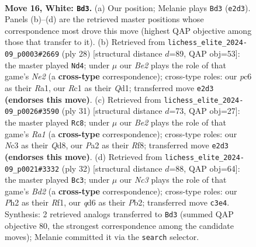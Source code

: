 \documentclass[11pt]{article}
\begin{document}
\clearpage

\begin{figure}[p]\centering
\begin{subfigure}{0.46\textwidth}\centering
\resizebox{\linewidth}{!}{%
\newchessgame
\chessboard[
  setfen={r1b1k2r/pp1n2pp/2pq4/3p2p1/3P4/2N1P3/PP2BPPP/2RQR1K1 w k - 6 16},
  showmover=false,
  pgfstyle=straightmove, color=movearrow, markmove={e2-d3}
]}
\caption{}
\end{subfigure}\hfill
\begin{subfigure}{0.46\textwidth}\centering
\resizebox{\linewidth}{!}{%
\newchessgame
\chessboard[
  setfen={rnb1k2r/5ppp/p3p3/1pqpP3/5P2/P1PB4/1P2N1PP/R2QK2R w KQkq - 0 15},
  showmover=false,
  pgfstyle=straightmove, color=movearrow, markmove={e2-d4}
]}
\caption{}
\end{subfigure}
\\[4pt]
\begin{subfigure}{0.46\textwidth}\centering
\resizebox{\linewidth}{!}{%
\newchessgame
\chessboard[
  setfen={r2q1rk1/1p1n1pp1/p2p4/P2Pp1bp/8/1N1Q1P2/1PP2BPP/R3K2R b KQ - 0 16},
  showmover=false,
  pgfstyle=straightmove, color=movearrow, markmove={a8-c8}
]}
\caption{}
\end{subfigure}\hfill
\begin{subfigure}{0.46\textwidth}\centering
\resizebox{\linewidth}{!}{%
\newchessgame
\chessboard[
  setfen={r3k2r/ppq2pb1/2n4p/3pPpp1/8/5N1P/PPPB1PP1/R2Q1RK1 w kq - 0 17},
  showmover=false,
  pgfstyle=straightmove, color=movearrow, markmove={d2-c3}
]}
\caption{}
\end{subfigure}
\caption{\textbf{Move 16, White: \texttt{Bd3}.} (a) Our position; Melanie plays \texttt{Bd3} (\texttt{e2d3}). Panels (b)--(d) are the retrieved master positions whose correspondence most drove this move (highest QAP objective among those that transfer to it). (b) Retrieved from \texttt{lichess\_elite\_2024-09\_p0003\#2669} (ply 28) [structural distance $d$=89, QAP obj=53]: the master played \texttt{Nd4}; under $\mu$ our \emph{Be2} plays the role of that game's \emph{Ne2} (a \textbf{cross-type} correspondence); cross-type roles: our \emph{p}c6 as their \emph{R}a1, our \emph{R}c1 as their \emph{Q}d1; transferred move \texttt{e2d3} \textbf{(endorses this move)}. (c) Retrieved from \texttt{lichess\_elite\_2024-09\_p0026\#3590} (ply 31) [structural distance $d$=73, QAP obj=27]: the master played \texttt{Rc8}; under $\mu$ our \emph{Be2} plays the role of that game's \emph{Ra1} (a \textbf{cross-type} correspondence); cross-type roles: our \emph{N}c3 as their \emph{Q}d8, our \emph{P}a2 as their \emph{R}f8; transferred move \texttt{e2d3} \textbf{(endorses this move)}. (d) Retrieved from \texttt{lichess\_elite\_2024-09\_p0021\#3332} (ply 32) [structural distance $d$=88, QAP obj=64]: the master played \texttt{Bc3}; under $\mu$ our \emph{Nc3} plays the role of that game's \emph{Bd2} (a \textbf{cross-type} correspondence); cross-type roles: our \emph{P}h2 as their \emph{R}f1, our \emph{q}d6 as their \emph{P}b2; transferred move \texttt{c3e4}. Synthesis: 2 retrieved analogs transferred to \texttt{Bd3} (summed QAP objective 80, the strongest correspondence among the candidate moves); Melanie committed it via the \texttt{search} selector.}

\end{figure}
\end{document}
